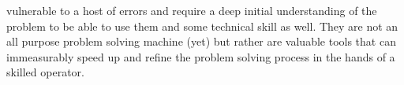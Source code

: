 \documentclass[10pt]{report}
\begin{document}
vulnerable to a host of errors and require a deep initial understanding of the problem to be able to use them and some technical skill as well. They are not an all purpose problem solving machine (yet) but rather are valuable tools that can immeasurably speed up and refine the problem solving process in the hands of a skilled operator.
\end{document}
